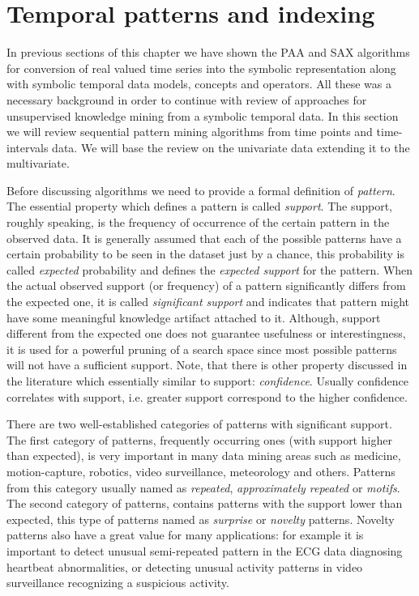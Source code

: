 \section{Temporal patterns and indexing} \label{tpatterns}
In previous sections of this chapter we have shown the PAA and SAX algorithms for conversion of real valued time series into the symbolic representation along with symbolic temporal data models, concepts and operators. All these was a necessary background in order to continue with review of approaches for unsupervised knowledge mining from a symbolic temporal data. In this section we will review sequential pattern mining algorithms from time points and time-intervals data. We will base the review on the univariate data extending it to the multivariate.


Before discussing algorithms we need to provide a formal definition of \textit{pattern}. The essential property which defines a pattern is called \textit{support}. The support, roughly speaking, is the frequency of occurrence of the certain pattern in the observed data. It is generally assumed that each of the possible patterns have a certain probability to be seen in the dataset just by a chance, this probability is called \textit{expected} probability and defines the \textit{expected support} for the pattern. When the actual observed support (or frequency) of a pattern significantly differs from the expected one, it is called \textit{significant support} and indicates that pattern might have some meaningful knowledge artifact attached to it. Although, support different from the expected one does not guarantee usefulness or interestingness, it is used for a powerful pruning of a search space since most possible patterns will not have a sufficient support. Note, that there is other property \cite{citeulike:2804633} discussed in the literature which essentially similar to support: \textit{confidence}. Usually confidence correlates with support, i.e. greater support correspond to the higher confidence.

There are two well-established categories of patterns with significant support. The first category of patterns, frequently occurring ones (with support higher than expected), is very important in many data mining areas such as medicine, motion-capture, robotics, video surveillance, meteorology and others. Patterns from this category usually named as \textit{repeated}, \textit{approximately repeated} or \textit{motifs}. The second category of patterns, contains patterns with the support lower than expected, this type of patterns named as \textit{surprise} or \textit{novelty} patterns. Novelty patterns also have a great value for many applications: for example it is important to detect unusual semi-repeated pattern in the ECG data diagnosing heartbeat abnormalities, or detecting unusual activity patterns in video surveillance recognizing a suspicious activity.

